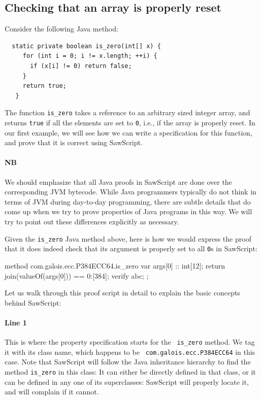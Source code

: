 \documentclass[12pt]{galois-whitepaper}
\newcommand{\sawScript}{{\sc SawScript}\xspace}
\begin{document}
\subsection{Checking that an array is properly reset}
Consider the following Java method:
\begin{Verbatim}
  static private boolean is_zero(int[] x) {
     for (int i = 0; i != x.length; ++i) {
       if (x[i] != 0) return false;
     }
     return true;
   }
\end{Verbatim}
The function {\tt is\_zero} takes a reference to an arbitrary sized integer array, and returns {\tt true} if all the elements
are set to {\tt 0}, i.e., if the array is properly reset. In our first example, we will see how we can write a
specification for this function, and prove that it is correct using \sawScript.

\paragraph{NB} We should emphasize that all Java proofs in \sawScript are done over the corresponding JVM bytecode. While Java programmers
typically do not think in terms of JVM during day-to-day programming, there are subtle details that do come up when
we try to prove properties of Java programs in this way. We will try to point out these differences explicitly as necessary.

Given the {\tt is\_zero} Java method above, here is how we would express the proof that it does indeed check that
its argument is properly set to all {\tt 0}s in \sawScript:

\begin{code}[numbers=left]
  method com.galois.ecc.P384ECC64.is_zero {
    var args[0] :: int[12];
    return join(valueOf(args[0])) == 0:[384];
    verify abc;
  };
\end{code}
Let us walk through this proof script in detail to explain the basic concepts behind \sawScript:

\paragraph{Line 1} This is where the property specification starts for the {\tt
is\_zero} method. We tag it with its class name, which happens to be {\tt
com.galois.ecc.P384ECC64} in this case. Note that \sawScript will follow the
Java inheritance hierarchy to find the method {\tt is\_zero} in this class: It
can either be directly defined in that class, or it can be defined in any one
of its superclasses: \sawScript will properly locate it, and will complain if
it cannot.
\end{document}
